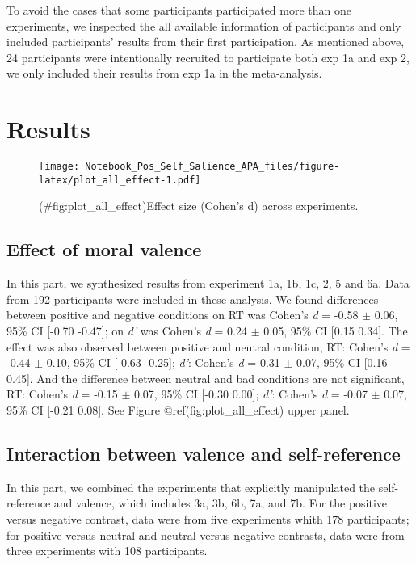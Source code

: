 \documentclass[
  man]{apa6}
\begin{document}
To avoid the cases that some participants participated more than one experiments, we inspected the all available information of participants and only included participants' results from their first participation. As mentioned above, 24 participants were intentionally recruited to participate both exp 1a and exp 2, we only included their results from exp 1a in the meta-analysis.

\hypertarget{results}{%
\section{Results}\label{results}}

\begin{figure}
\centering
\texttt{[image: Notebook\_Pos\_Self\_Salience\_APA\_files/figure-latex/plot\_all\_effect-1.pdf]}
\caption{(\#fig:plot\_all\_effect)Effect size (Cohen's d) across experiments.}
\end{figure}

\hypertarget{effect-of-moral-valence}{%
\subsection{Effect of moral valence}\label{effect-of-moral-valence}}

In this part, we synthesized results from experiment 1a, 1b, 1c, 2, 5 and 6a. Data from 192 participants were included in these analysis. We found differences between positive and negative conditions on RT was Cohen's \emph{d} = -0.58 \(\pm\) 0.06, 95\% CI {[}-0.70 -0.47{]}; on \emph{d'} was Cohen's \emph{d} = 0.24 \(\pm\) 0.05, 95\% CI {[}0.15 0.34{]}. The effect was also observed between positive and neutral condition, RT: Cohen's \emph{d} = -0.44 \(\pm\) 0.10, 95\% CI {[}-0.63 -0.25{]}; \emph{d'}: Cohen's \emph{d} = 0.31 \(\pm\) 0.07, 95\% CI {[}0.16 0.45{]}. And the difference between neutral and bad conditions are not significant, RT: Cohen's \emph{d} = -0.15 \(\pm\) 0.07, 95\% CI {[}-0.30 0.00{]}; \emph{d'}: Cohen's \emph{d} = -0.07 \(\pm\) 0.07, 95\% CI {[}-0.21 0.08{]}. See Figure @ref(fig:plot\_all\_effect) upper panel.

\hypertarget{interaction-between-valence-and-self-reference}{%
\subsection{Interaction between valence and self-reference}\label{interaction-between-valence-and-self-reference}}

In this part, we combined the experiments that explicitly manipulated the self-reference and valence, which includes 3a, 3b, 6b, 7a, and 7b. For the positive versus negative contrast, data were from five experiments whith 178 participants; for positive versus neutral and neutral versus negative contrasts, data were from three experiments with 108 participants.
\end{document}

